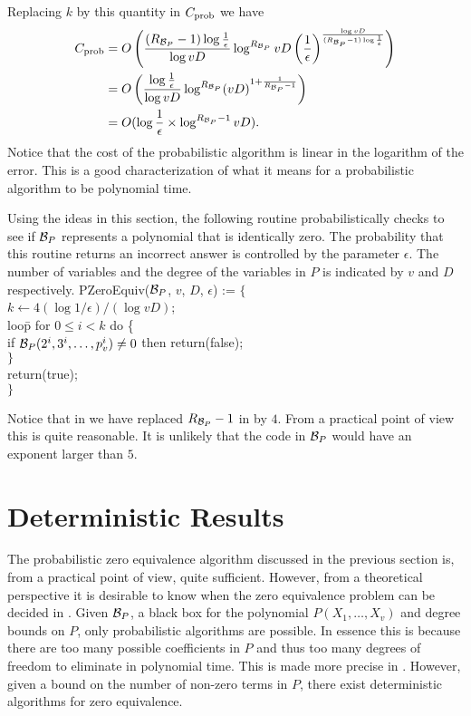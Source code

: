 Replacing $k$ by this quantity in $C_{\rm prob}$ we have
\[
\begin{aligned}
C_{\rm prob} &= 
O\left(\frac{({R_{{\cal B}_P}}-1) \log \frac{1}{\epsilon}}{\log vD}
 \log^{R_{{\cal B}_P}} {vD \left({1 \over
\epsilon}\right)^{ \log vD \over ({R_{{\cal B}_P}}-1) \log \frac{1}{\epsilon}}}\right)
\\
& = O\left({\log {1 \over \epsilon} \over \log vD} 
  \log^{R_{{\cal B}_P}}  (vD)^{1+{1\over {R_{{\cal B}_P}}-1}}\right)\\
& = O(\log {1 \over \epsilon} \times \log^{{R_{{\cal B}_P}}-1} vD).
\end{aligned}
\]
Notice that the cost of the probabilistic algorithm is linear in the
logarithm of the error.  This is a good characterization of what it
means for a probabilistic algorithm to be polynomial time.

\medskip
Using the ideas in this section, the following routine
probabilistically checks to see if ${\cal B}_P$ represents a polynomial
that is identically zero.  The probability that this routine returns
an incorrect answer is controlled by the parameter $\epsilon$.  The
number of variables and the degree of the variables in $P$ is
indicated by $v$ and $D$ respectively.
\begindsacode
PZeroEquiv(${\cal B}_P$, $v$, $D$, $\epsilon$) := $\{$\\
\> $k \leftarrow  4 (\log 1/\epsilon)/(\log vD)$; \\
\> loo\=p for $0 \le i < k$ do \{ \\
\>\> if ${\cal B}_P(2^i, 3^i, \ldots, p_v^i) \not=0$ then return(false); \\
\>\> $\}$\\
\> return(true);\\
\> $\}$
\enddsacode

\noindent
Notice that in  we have replaced $R_{{\cal B}_P} - 1$ in
 by $4$.  From a practical point of view this is
quite reasonable.  It is unlikely that the code in ${\cal B}_P$ would
have an exponent larger than $5$.

\section{Deterministic Results}
\label{Zero:Deterministic:Sec}

The probabilistic zero equivalence algorithm discussed in the previous
section is, from a practical point of view, quite sufficient.  However,
from a theoretical perspective it is desirable to know when the zero 
equivalence problem can be decided in .  Given ${\cal B}_P$, a black box for the polynomial 
$P(X_1, \ldots, X_v)$ and degree bounds on $P$, only probabilistic 
algorithms are possible.  In essence this is because there are too many 
possible coefficients in $P$ and thus too many degrees of freedom to 
eliminate in polynomial time.  This is made more precise in 
.  However, given a bound on the number of 
non-zero terms in $P$, there exist deterministic algorithms for zero 
equivalence. 

